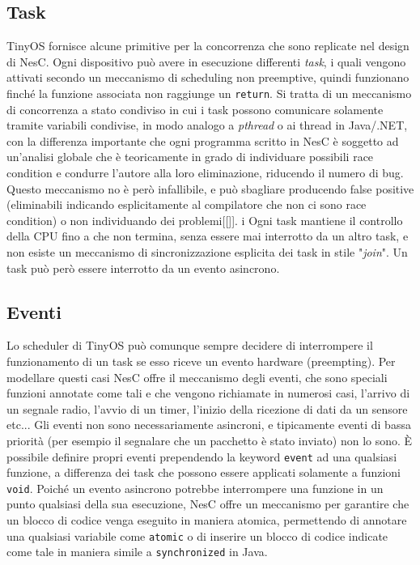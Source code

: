 \documentclass[twoside,11pt,a4paper,italian,openany]{book}
\begin{document}
\subsection{Task}
TinyOS fornisce alcune primitive per la concorrenza che sono replicate nel design di NesC.
Ogni dispositivo può avere in esecuzione differenti \emph{task}, i quali vengono attivati 
secondo un 
meccanismo di scheduling non preemptive, quindi funzionano finché la funzione associata non 
raggiunge un \texttt{return}. Si tratta di un meccanismo di concorrenza a stato condiviso in cui 
i task possono comunicare solamente tramite variabili condivise, in modo analogo a 
\emph{pthread} o ai thread in Java/.NET, con la differenza importante che ogni programma scritto in  NesC è soggetto ad 
un'analisi globale che è teoricamente in grado di individuare possibili race condition e 
condurre l'autore alla loro eliminazione, riducendo il numero di bug. 
Questo meccanismo no è però infallibile, e può sbagliare producendo false positive 
(eliminabili indicando esplicitamente al compilatore che non ci sono race condition) o non 
individuando dei problemi[[]]. i
Ogni task mantiene il controllo della CPU fino a che non termina, senza essere mai interrotto da un altro task, e non esiste un meccanismo di sincronizzazione esplicita 
dei task in stile "\emph{join}".
Un task può però essere interrotto da un evento asincrono.


\subsection{Eventi}
Lo scheduler di TinyOS può comunque sempre decidere di interrompere il funzionamento di un task 
se esso riceve un evento hardware (preempting). 
Per modellare questi casi NesC offre il meccanismo degli eventi, 
che sono speciali funzioni annotate come tali e che vengono richiamate in numerosi 
casi, l'arrivo di un segnale radio, l'avvio di un timer, l'inizio della ricezione di dati da un sensore etc...
Gli eventi non sono necessariamente asincroni, e tipicamente eventi di bassa priorità (per esempio il segnalare che un pacchetto è stato inviato) non lo sono.
\`E possibile definire propri eventi prependendo la keyword \texttt{event} ad una qualsiasi 
funzione, a differenza dei task che possono essere applicati solamente a funzioni \texttt{void}.
Poiché un evento asincrono potrebbe interrompere una funzione in un punto qualsiasi della sua esecuzione, NesC offre un meccanismo per garantire che un blocco di codice venga eseguito in 
maniera atomica,  permettendo di annotare una qualsiasi variabile come \texttt{atomic} o 
di inserire un blocco di codice indicate come tale in maniera simile a \texttt{synchronized} 
in Java.
\end{document}
